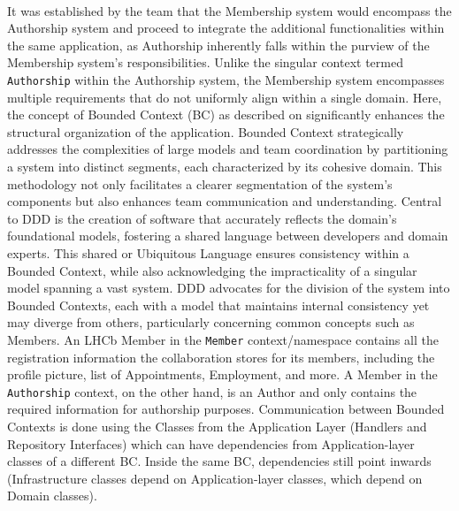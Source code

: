 \paragraph{} It was established by the team that the Membership system would encompass the Authorship system and proceed to integrate the additional functionalities within the same application, as Authorship inherently falls within the purview of the Membership system's responsibilities. Unlike the singular context termed \verb|Authorship| within the Authorship system, the Membership system encompasses multiple requirements that do not uniformly align within a single domain. Here, the concept of Bounded Context (BC) as described on \cite{fowler2014bounded} significantly enhances the structural organization of the application. Bounded Context strategically addresses the complexities of large models and team coordination by partitioning a system into distinct segments, each characterized by its cohesive domain. This methodology not only facilitates a clearer segmentation of the system's components but also enhances team communication and understanding. Central to DDD is the creation of software that accurately reflects the domain's foundational models, fostering a shared language between developers and domain experts. This shared or Ubiquitous Language ensures consistency within a Bounded Context, while also acknowledging the impracticality of a singular model spanning a vast system. DDD advocates for the division of the system into Bounded Contexts, each with a model that maintains internal consistency yet may diverge from others, particularly concerning common concepts such as Members. An LHCb Member in the \verb|Member| context/namespace contains all the registration information the collaboration stores for its members, including the profile picture, list of Appointments, Employment, and more. A Member in the \verb|Authorship| context, on the other hand, is an Author and only contains the required information for authorship purposes. Communication between Bounded Contexts is done using the Classes from the Application Layer (Handlers and Repository Interfaces) which can have dependencies from Application-layer classes of a different BC. Inside the same BC, dependencies still point inwards (Infrastructure classes depend on Application-layer classes, which depend on Domain classes).


